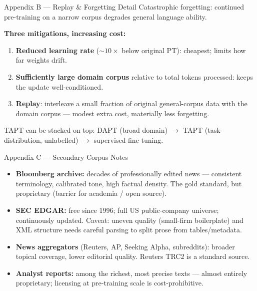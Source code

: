 \documentclass[9pt,t]{beamer}
\begin{document}
\begin{frame}[noframenumbering]{Appendix B --- Replay \& Forgetting Detail}
Catastrophic forgetting: continued pre-training on a narrow corpus degrades general
language ability.

\medskip
\textbf{Three mitigations, increasing cost:}
\begin{enumerate}
  \item \textbf{Reduced learning rate} ($\sim 10\times$ below original PT): cheapest;
        limits how far weights drift.
  \item \textbf{Sufficiently large domain corpus} relative to total tokens processed:
        keeps the update well-conditioned.
  \item \textbf{Replay}: interleave a small fraction of original general-corpus data
        with the domain corpus --- modest extra cost, materially less forgetting.
\end{enumerate}

\medskip
TAPT can be stacked on top: DAPT (broad domain) $\to$ TAPT (task-distribution,
unlabelled) $\to$ supervised fine-tuning.
\end{frame}

\begin{frame}[noframenumbering]{Appendix C --- Secondary Corpus Notes}
\begin{itemize}
  \item \textbf{Bloomberg archive:} decades of professionally edited news ---
        consistent terminology, calibrated tone, high factual density. The gold
        standard, but proprietary (barrier for academia / open source).
  \item \textbf{SEC EDGAR:} free since 1996; full US public-company universe;
        continuously updated. Caveat: uneven quality (small-firm boilerplate) and
        XML structure needs careful parsing to split prose from tables/metadata.
  \item \textbf{News aggregators} (Reuters, AP, Seeking Alpha, subreddits): broader
        topical coverage, lower editorial quality. Reuters TRC2 is a standard source.
  \item \textbf{Analyst reports:} among the richest, most precise texts --- almost
        entirely proprietary; licensing at pre-training scale is cost-prohibitive.
\end{itemize}
\end{frame}
\end{document}
